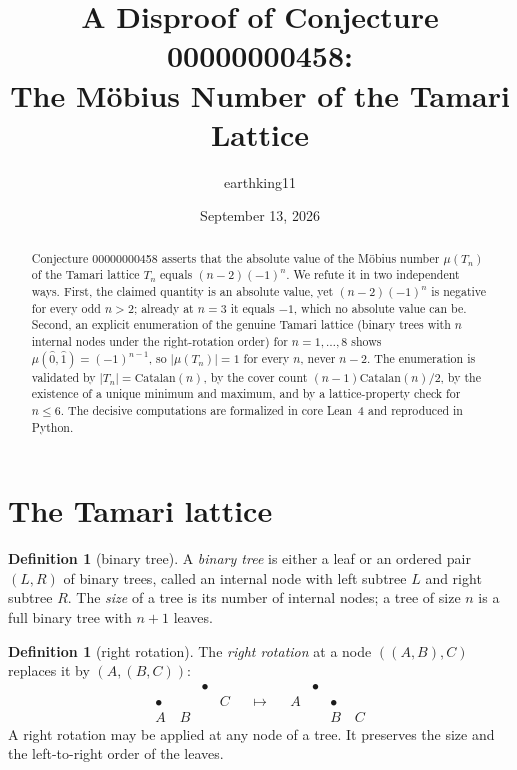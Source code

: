 \documentclass[11pt]{article}
\title{A Disproof of Conjecture 00000000458:\\
The M\"obius Number of the Tamari Lattice}
\author{earthking11}
\date{September 13, 2026}
\theoremstyle{definition}
\newtheorem{definition}[theorem]{Definition}
\begin{document}
\maketitle

\begin{abstract}
Conjecture 00000000458 asserts that the absolute value of the M\"obius
number $\mu(T_n)$ of the Tamari lattice $T_n$ equals $(n-2)(-1)^n$. We
refute it in two independent ways. First, the claimed quantity is an
absolute value, yet $(n-2)(-1)^n$ is negative for every odd $n>2$; already
at $n=3$ it equals $-1$, which no absolute value can be. Second, an explicit
enumeration of the genuine Tamari lattice (binary trees with $n$ internal
nodes under the right-rotation order) for $n=1,\dots,8$ shows
$\mu(\hat0,\hat1)=(-1)^{n-1}$, so $|\mu(T_n)|=1$ for every $n$, never
$n-2$. The enumeration is validated by $|T_n|=\mathrm{Catalan}(n)$, by the
cover count $(n-1)\mathrm{Catalan}(n)/2$, by the existence of a unique
minimum and maximum, and by a lattice-property check for $n\le 6$. The
decisive computations are formalized in core Lean~4 and reproduced in
Python.
\end{abstract}

\section{The Tamari lattice}

\begin{definition}[binary tree]
A \emph{binary tree} is either a leaf or an ordered pair $(L,R)$ of binary
trees, called an internal node with left subtree $L$ and right subtree $R$.
The \emph{size} of a tree is its number of internal nodes; a tree of size
$n$ is a full binary tree with $n+1$ leaves.
\end{definition}

\begin{definition}[right rotation]
The \emph{right rotation} at a node $( (A,B), C)$ replaces it by
$(A,(B,C))$:
\[
\begin{array}{ccc}
 & \bullet & \\
 \bullet & & C\\
 A \quad B & &
\end{array}
\quad\longmapsto\quad
\begin{array}{ccc}
 & \bullet & \\
 A & & \bullet\\
 & & B \quad C
\end{array}
\]
A right rotation may be applied at any node of a tree. It preserves the
size and the left-to-right order of the leaves.
\end{definition}
\end{document}
